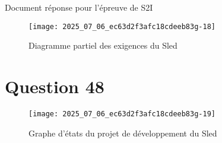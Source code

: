 Document réponse pour l'épreuve de S2I\\

\begin{figure}[!h]
\centering
\texttt{[image: 2025\_07\_06\_ec63d2f3afc18cdeeb83g-18]}

\caption{\label{ccs_mp_2022_fig_A}Diagramme partiel des exigences du Sled}
\end{figure}

\section*{Question 48}
\begin{figure}[!h]
\centering

\texttt{[image: 2025\_07\_06\_ec63d2f3afc18cdeeb83g-19]}

\caption{\label{ccs_mp_2022_fig_B}Graphe d'états du projet de développement du Sled}
\end{figure}

